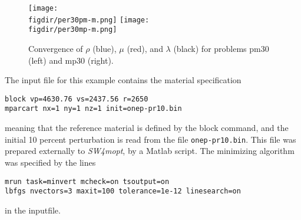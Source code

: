 \documentclass[12pt]{report}
\def\figdir{mfigs}
\begin{document}
\begin{figure}
\begin{center}
\texttt{[image: \\figdir/per30pm-m.png]}\hfil
\texttt{[image: \\figdir/per30mp-m.png]}
\caption{Convergence of $\rho$ (blue), $\mu$ (red), and $\lambda$ (black) for 
problems pm30 (left) and mp30 (right).}
\label{fig:per30vars}
\end{center}
\end{figure}
\par
The input file for this example contains the material specification
\begin{verbatim}
block vp=4630.76 vs=2437.56 r=2650
mparcart nx=1 ny=1 nz=1 init=onep-pr10.bin
\end{verbatim}
meaning that the reference material is defined by the block command, and the initial 10 percent perturbation
is read from the file \verb+onep-pr10.bin+. This file was prepared externally to \emph{SW4mopt}, by a Matlab script. 
The minimizing algorithm was specified by the lines
\begin{verbatim}
mrun task=minvert mcheck=on tsoutput=on
lbfgs nvectors=3 maxit=100 tolerance=1e-12 linesearch=on 
\end{verbatim}
in the inputfile.
\end{document}
